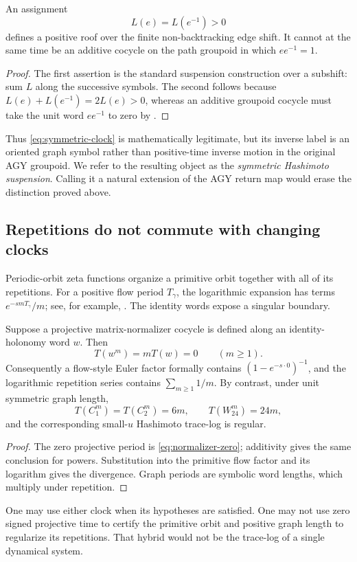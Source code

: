 \begin{corollary}
\label{cor:graph-clock}
An assignment
\begin{equation}
 L(e)=L(e^{-1})>0
 \label{eq:symmetric-clock}
\end{equation}
defines a positive roof over the finite non-backtracking edge shift.  It
cannot at the same time be an additive cocycle on the path groupoid in which
$ee^{-1}=1$.
\end{corollary}

\begin{proof}
The first assertion is the standard suspension construction over a subshift:
sum $L$ along the successive symbols.  The second follows because
$L(e)+L(e^{-1})=2L(e)>0$, whereas an additive groupoid cocycle must take the
unit word $ee^{-1}$ to zero by .
\end{proof}

Thus \eqref{eq:symmetric-clock} is mathematically legitimate, but its inverse
label is an oriented graph symbol rather than positive-time inverse motion in
the original AGY groupoid.  We refer to the resulting object as the
\emph{symmetric Hashimoto suspension}.  Calling it a natural extension of the
AGY return map would erase the distinction proved above.

\subsection{Repetitions do not commute with changing clocks}

Periodic-orbit zeta functions organize a primitive orbit together with all of
its repetitions.  For a positive flow period $T_\gamma$, the logarithmic
expansion has terms $e^{-smT_\gamma}/m$; see, for example,
\citet[Section~2.2]{DyatlovZworski2016}.  The identity words expose a singular
boundary.

\begin{proposition}
\label{prop:repetition-dichotomy}
Suppose a projective matrix-normalizer cocycle is defined along an
identity-holonomy word $w$.  Then
\[
 T(w^m)=mT(w)=0\qquad(m\geq1).
\]
Consequently a flow-style Euler factor formally contains
$(1-e^{-s\cdot0})^{-1}$, and the logarithmic repetition series contains
$\sum_{m\geq1}1/m$.  By contrast, under unit symmetric graph length,
\[
 T(C_1^m)=T(C_2^m)=6m,\qquad T(W_{24}^m)=24m,
\]
and the corresponding small-$u$ Hashimoto trace-log is regular.
\end{proposition}

\begin{proof}
The zero projective period is \eqref{eq:normalizer-zero}; additivity gives the
same conclusion for powers.  Substitution into the primitive flow factor and
its logarithm gives the divergence.  Graph periods are symbolic word lengths,
which multiply under repetition.
\end{proof}

One may use either clock when its hypotheses are satisfied.  One may not use
zero signed projective time to certify the primitive orbit and positive graph
length to regularize its repetitions.  That hybrid would not be the
trace-log of a single dynamical system.
